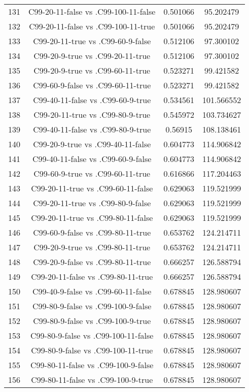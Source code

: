 \documentclass[a4paper,10pt]{article}
\begin{document}
\begin{landscape}
\begin{table}[!htp]
\begin{tabular}{cccc}
131&C99-20-11-false vs .C99-100-11-false&0.501066&95.202479\\
132&C99-20-11-false vs .C99-100-11-true&0.501066&95.202479\\
133&C99-20-11-true vs .C99-60-9-false&0.512106&97.300102\\
134&C99-20-9-true vs .C99-20-11-true&0.512106&97.300102\\
135&C99-20-9-true vs .C99-60-11-true&0.523271&99.421582\\
136&C99-60-9-false vs .C99-60-11-true&0.523271&99.421582\\
137&C99-40-11-false vs .C99-60-9-true&0.534561&101.566552\\
138&C99-20-11-true vs .C99-80-9-true&0.545972&103.734627\\
139&C99-40-11-false vs .C99-80-9-true&0.56915&108.138461\\
140&C99-20-9-true vs .C99-40-11-false&0.604773&114.906842\\
141&C99-40-11-false vs .C99-60-9-false&0.604773&114.906842\\
142&C99-60-9-true vs .C99-60-11-true&0.616866&117.204463\\
143&C99-20-11-true vs .C99-60-11-false&0.629063&119.521999\\
144&C99-20-11-true vs .C99-80-9-false&0.629063&119.521999\\
145&C99-20-11-true vs .C99-80-11-false&0.629063&119.521999\\
146&C99-60-9-false vs .C99-80-11-true&0.653762&124.214711\\
147&C99-20-9-true vs .C99-80-11-true&0.653762&124.214711\\
148&C99-20-9-false vs .C99-80-11-true&0.666257&126.588794\\
149&C99-20-11-false vs .C99-80-11-true&0.666257&126.588794\\
150&C99-40-9-false vs .C99-60-11-false&0.678845&128.980607\\
151&C99-80-9-false vs .C99-100-9-false&0.678845&128.980607\\
152&C99-80-9-false vs .C99-100-9-true&0.678845&128.980607\\
153&C99-80-9-false vs .C99-100-11-false&0.678845&128.980607\\
154&C99-80-9-false vs .C99-100-11-true&0.678845&128.980607\\
155&C99-80-11-false vs .C99-100-9-false&0.678845&128.980607\\
156&C99-80-11-false vs .C99-100-9-true&0.678845&128.980607\\

\end{tabular}
\end{table}
\end{landscape}
\end{document}
